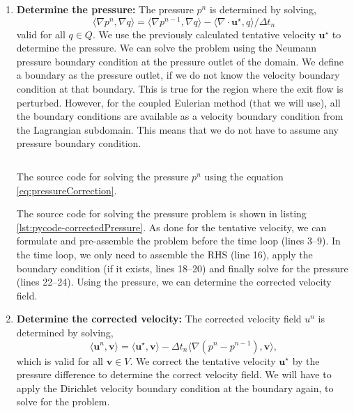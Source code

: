 \begin{enumerate}
	\item \textbf{Determine the pressure:} The pressure $p^n$ is determined by solving,	
		\begin{equation}
		\langle \nabla p^n, \nabla q \rangle = \langle \nabla p^{n-1}, \nabla q\rangle - \langle \nabla \cdot \mathbf{u}^{\star}, q \rangle / \Delta t_n
		\label{eq:pressureCorrection}
		\end{equation}
	valid for all $q \in Q$. We use the previously calculated tentative velocity $\mathbf{u}^{\star}$ to determine the pressure. We can solve the problem using the Neumann pressure boundary condition at the pressure outlet of the domain. We define a boundary as the pressure outlet, if we do not know the velocity boundary condition at that boundary. This is true for the region where the exit flow is perturbed. However, for the coupled Eulerian method (that we will use), all the boundary conditions are available as a velocity boundary condition from the Lagrangian subdomain. This means that we do not have to assume any pressure boundary condition.

		\begin{listing}[!t]
		\inputminted[fontseries=courier,obeytabs,fontsize=\scriptsize,mathescape,linenos,numbersep=5pt,frame=lines,framesep=2mm,xleftmargin=20mm,xrightmargin=20mm]{python}{figures/eulerian/correctedPressure.py}
		\caption{The source code for solving the pressure $p^n$ using the equation \ref{eq:pressureCorrection}.}
		\label{lst:pycode-correctedPressure}
		\end{listing}

	The source code for solving the pressure problem is shown in listing \ref{lst:pycode-correctedPressure}. As done for the tentative velocity, we can formulate and pre-assemble the problem before the time loop (lines \numrange{3}{9}). In the time loop, we only need to assemble the RHS (line 16), apply the boundary condition (if it exists, lines \numrange{18}{20}) and finally solve for the pressure (lines \numrange{22}{24}). Using the pressure, we can determine the corrected velocity field. 
		
	\item \textbf{Determine the corrected velocity:} The corrected velocity field $u^n$ is determined by solving,
		\begin{equation}
		\langle \mathbf{u}^n, \mathbf{v}\rangle = \langle \mathbf{u}^{\star},\mathbf{v} \rangle - \Delta t_n \langle \nabla(p^n - p^{n-1}),\mathbf{v} \rangle,
		\label{eq:velocityCorrection}	
		\end{equation}
	which is valid for all $\mathbf{v} \in V$. We correct the tentative velocity $\mathbf{u}^{\star}$ by the pressure difference to determine the correct velocity field. We will have to apply the Dirichlet velocity boundary condition at the boundary again, to solve for the problem.
	

\end{enumerate}
